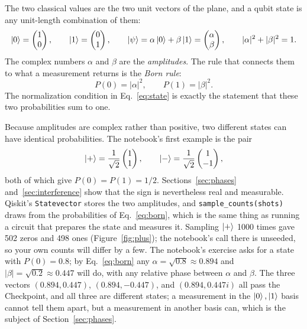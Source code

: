 \documentclass[11pt]{article}
\newcommand{\code}[1]{\texttt{#1}}
\begin{document}
The two classical values are the two unit vectors of the plane, and a qubit state is any unit-length combination of them:
\begin{equation}
\ket{0} = \begin{pmatrix}1\\0\end{pmatrix},\qquad
\ket{1} = \begin{pmatrix}0\\1\end{pmatrix},\qquad
\ket{\psi} = \alpha\ket{0} + \beta\ket{1} = \begin{pmatrix}\alpha\\\beta\end{pmatrix},\qquad
|\alpha|^2 + |\beta|^2 = 1 .
\label{eq:state}
\end{equation}
The complex numbers $\alpha$ and $\beta$ are the \emph{amplitudes}. The rule that connects them to what a measurement returns is the \emph{Born rule}:
\begin{equation}
P(0) = |\alpha|^2, \qquad P(1) = |\beta|^2 .
\label{eq:born}
\end{equation}
The normalization condition in Eq.~\eqref{eq:state} is exactly the statement that these two probabilities sum to one.

Because amplitudes are complex rather than positive, two different states can have identical probabilities. The notebook's first example is the pair
\begin{equation}
\ket{+} = \frac{1}{\sqrt2}\begin{pmatrix}1\\1\end{pmatrix}, \qquad
\ket{-} = \frac{1}{\sqrt2}\begin{pmatrix}1\\-1\end{pmatrix},
\label{eq:plusminus}
\end{equation}
both of which give $P(0) = P(1) = 1/2$. Sections~\ref{sec:phases} and~\ref{sec:interference} show that the sign is nevertheless real and measurable. Qiskit's \code{Statevector} stores the two amplitudes, and \code{sample\_counts(shots)} draws from the probabilities of Eq.~\eqref{eq:born}, which is the same thing as running a circuit that prepares the state and measures it. Sampling $\ket{+}$ 1000 times gave 502 zeros and 498 ones (Figure~\ref{fig:plus}); the notebook's call there is unseeded, so your own counts will differ by a few. The notebook's exercise asks for a state with $P(0) = 0.8$; by Eq.~\eqref{eq:born} any $\alpha = \sqrt{0.8} \approx 0.894$ and $|\beta| = \sqrt{0.2} \approx 0.447$ will do, with any relative phase between $\alpha$ and $\beta$. The three vectors $(0.894, 0.447)$, $(0.894, -0.447)$, and $(0.894, 0.447i)$ all pass the Checkpoint, and all three are different states; a measurement in the $\ket{0},\ket{1}$ basis cannot tell them apart, but a measurement in another basis can, which is the subject of Section~\ref{sec:phases}.
\end{document}
